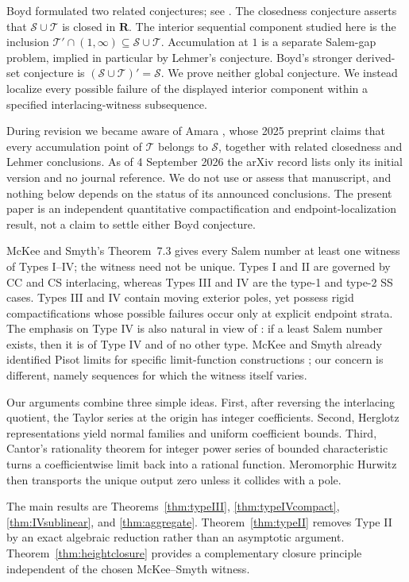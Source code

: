\documentclass[11pt,reqno]{amsart}
\theoremstyle{definition}
\theoremstyle{remark}
\newcommand{\R}{\mathbf R}
\newcommand{\calS}{\mathcal S}
\newcommand{\calT}{\mathcal T}
\begin{document}
Boyd formulated two related conjectures; see \cite{boyd77,boyd78}.  The
closedness conjecture asserts that $\calS\cup\calT$ is closed in $\R$.  The
interior sequential component studied here is the inclusion
$\calT'\cap(1,\infty)\subseteq\calS\cup\calT$.
Accumulation at $1$ is a separate Salem-gap problem, implied in particular by
Lehmer's conjecture.  Boyd's stronger derived-set conjecture is
$(\calS\cup\calT)'=\calS$.  We prove neither global conjecture.  We instead
localize every possible failure of the displayed interior component within a
specified interlacing-witness subsequence.

During revision we became aware of Amara \cite{amara25}, whose 2025 preprint
claims that every accumulation point of $\calT$ belongs to $\calS$, together
with related closedness and Lehmer conclusions.  As of 4 September 2026 the
arXiv record lists only its initial version and no journal reference.  We do
not use or assess that manuscript, and nothing below depends on the status of
its announced conclusions.  The present paper is an independent quantitative
compactification and endpoint-localization result, not a claim to settle
either Boyd conjecture.

McKee and Smyth's Theorem~7.3 \cite{mckeesmyth} gives every Salem number at
least one witness of Types I--IV; the witness need not be unique.  Types I
and II are governed by CC and CS interlacing, whereas Types III and IV are
the type-1 and type-2 SS cases.  Types III and IV contain moving exterior
poles, yet possess rigid compactifications whose possible failures occur only
at explicit endpoint strata.  The emphasis on Type IV is also natural in
view of \cite[Thm.~9.2]{mckeesmyth}: if a least Salem number exists, then it
is of Type IV and of no other type.  McKee and Smyth already identified Pisot
limits for specific limit-function constructions \cite[Thms.~4.2 and
5.3]{mckeesmyth}; our concern is different, namely sequences for which the
witness itself varies.

Our arguments combine three simple ideas.  First, after reversing the
interlacing quotient, the Taylor series at the origin has integer
coefficients.  Second, Herglotz representations yield normal families and
uniform coefficient bounds.  Third, Cantor's rationality theorem for
integer power series of bounded characteristic \cite{cantor} turns a
coefficientwise limit back into a rational function.  Meromorphic Hurwitz
then transports the unique output zero unless it collides with a pole.

The main results are Theorems~\ref{thm:typeIII}, \ref{thm:typeIVcompact},
\ref{thm:IVsublinear}, and \ref{thm:aggregate}.  Theorem~\ref{thm:typeII}
removes Type II by an exact algebraic reduction rather than an asymptotic
argument.  Theorem~\ref{thm:heightclosure} provides a complementary closure
principle independent of the chosen McKee--Smyth witness.
\end{document}
